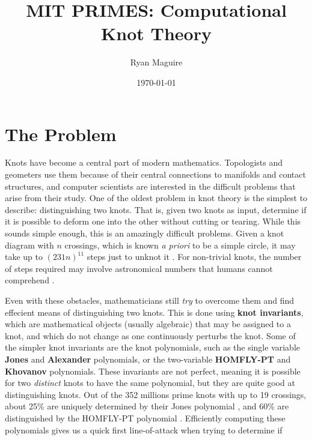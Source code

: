 \documentclass{article}
\title{MIT PRIMES: Computational Knot Theory}
\author{Ryan Maguire}
\date{\today}
\begin{document}
    \maketitle
    \section{The Problem}
        Knots have become a central part of modern mathematics.
        Topologists and geometers use them because of their central connections
        to manifolds and contact structures, and computer scientists are
        interested in the difficult problems that arise from their study.
        One of the oldest problem in knot theory is the simplest to describe:
        distinguishing two knots. That is, given two knots as input, determine
        if it is possible to deform one into the other without cutting or
        tearing. While this sounds simple enough, this is an amazingly
        difficult problems. Given a knot diagram with $n$ crossings, which is
        known \textit{a priori} to be a simple circle, it may take up to
        $(231n)^{11}$ steps just to unknot it \cite{Lackenby2015Unknotting}.
        For non-trivial knots, the number of steps required may involve
        astronomical numbers that humans cannot comprehend
        \cite{CowardLackenbyReidemeisterUpperBound}.
        \par\hfill\par
        Even with these obstacles, mathematicians still \textit{try} to
        overcome them and find effecient means of distinguishing two knots.
        This is done using \textbf{knot invariants}, which are mathematical
        objects (usually algebraic) that may be assigned to a knot, and which
        do not change as one continuously perturbs the knot. Some of the simpler
        knot invariants are the knot polynomials, such as the single variable
        \textbf{Jones} and \textbf{Alexander} polynomials, or the
        two-variable \textbf{HOMFLY-PT} and \textbf{Khovanov} polynomials.
        These invariants are not perfect, meaning
        it is possible for two \textit{distinct} knots to have the same
        polynomial, but they are quite good at distinguishing knots.
        Out of the 352 millions prime knots with up to 19 crossings, about
        25\% are uniquely determined by their Jones polynomial
        \cite{JonesData}, and 60\% are distinguished by the HOMFLY-PT
        polynomial \cite{HOMFLYData}. Efficiently computing these polynomials
        gives us a quick first line-of-attack when trying to determine if
\end{document}
